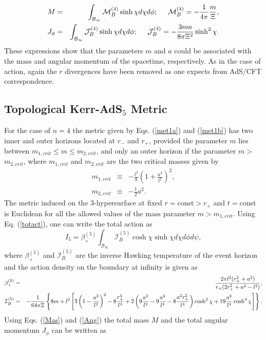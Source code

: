 \documentclass[a4paper,12pt,onecolumn]{revtex4}
\begin{document}
\begin{eqnarray}
M &=&\int_{\mathcal{B}_\infty }\mathcal{M}_B^{(4)}\sinh \chi d\chi d\phi ;%
\hspace{.5cm }\mathcal{M}_B^{(4)}=-\frac 1{4\pi }\frac m\Xi ,  \label{Mt4} \\
J_\phi &=&\int_{\mathcal{B}_\infty }\mathcal{J}_B^{(4)}\sinh \chi d\chi
d\phi ;\hspace{.5cm }\mathcal{J}_B^{(4)}=-\frac{3ma}{8\pi \Xi ^2}\sinh
^2\chi .  \label{Jt4}
\end{eqnarray}
These expressions show that the parameters $m$ and $a$ could be
associated with the mass and angular momentum of the spacetime,
respectively. As in the case of action, again the $r$ divergences
have been removed as one expects from AdS/CFT correspondence.

\subsection{Topological Kerr-AdS$_5$ Metric}

For the case of $n=4$ the metric given by Eqs. (\ref{met1a}) and
(\ref{met1b}) has two inner and outer horizons located at $r_{-}$
and $r_{+}$, provided the parameter $m$ lies between
$m_{1,crit}\leq m\leq m_{2,crit}$, and only an
outer horizon if the parameter $m>$ $m_{2,crit}$, where $m_{1,crit}$ and $%
m_{2,crit}$ are the two critical masses given by
\begin{eqnarray}
m_{1,crit} &\equiv &-\frac{l^2}8\left(1+\frac{a^2}{l^2}\right)^2,  \label{m1crit5} \\
m_{2,crit} &\equiv &-\frac 12a^2.  \label{m2crit5}
\end{eqnarray}
The metric induced on the $3$-hypersurface at fixed
$r=$const$>r_{+}$ and $t=$const is Euclidean for all the allowed
values of the mass parameter $m>m_{1,crit}$. Using Eq.
(\ref{totact}), one can write the total action as
\begin{equation}
I_5=\beta _{+}^{(5)}\int_{\mathcal{B}_\infty }\mathcal{I}_B^{(5)}\cosh \chi
\sinh \chi d\chi d\phi d\psi ,  \label{At5}
\end{equation}
where $\beta _{+}^{(5)}$ and $\mathcal{I}_B^{(5)}$ are the inverse
Hawking temperature of the event horizon and the action density on
the boundary at infinity is given as
\begin{eqnarray*}
\beta _{+}^{(5)} &=&\frac{2\pi l^2(r_{+}^2+a^2)}{r_{+}(2r_{+}^2+a^2-l^2)},
\label{bet5} \\
\mathcal{I}_B^{(5)} &=&-\frac 1{64\pi \Xi } \left\{8m+l^2 \left[3\left(1-\frac{a^2}{l^2}\right)^2-8%
\frac{r_{+}^4}{l^4}+2\left(9\frac{a^2}{l^2}-9\frac{a^4}{l^4}-8\frac{a^2r_{+}^2}{%
l^4}\right)\cosh ^2\chi +19\frac{a^4}{l^4}\cosh ^4\chi \right]
\right\}.
\end{eqnarray*}
Using Eqs. (\ref{Mas}) and (\ref{Ang}) the total mass $M$ and the
total angular momentum $J_\phi $ can be written as
\end{document}

